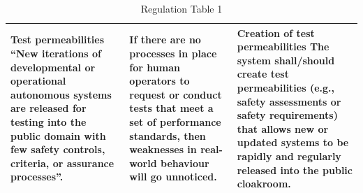 \documentclass[lettersize,journal]{IEEEtran}
\begin{document}
\begin{landscape}
\begin{table}[]
\begin{tabular}{|p{0.3\textheight}|p{0.35\textheight}|p{0.35\textheight}|}
\hline
\textbf{Test permeabilities}
``New iterations of developmental or operational autonomous systems are released for testing into the public domain with few safety controls, criteria, or assurance processes”. \cite{macrae2021learning} & If there are no processes in place for human operators to request or conduct tests that meet a set of performance standards, then weaknesses in real-world behaviour will go unnoticed. & \textbf{Creation of test permeabilities} The system shall/should create test permeabilities (e.g., safety assessments or safety requirements) that allows new or updated systems to be rapidly and regularly released into the public cloakroom. \\
\hline
    \end{tabular}
    \caption{Regulation Table 1}
    \label{tab:reg_1}
\end{table}
\end{landscape}
\end{document}
